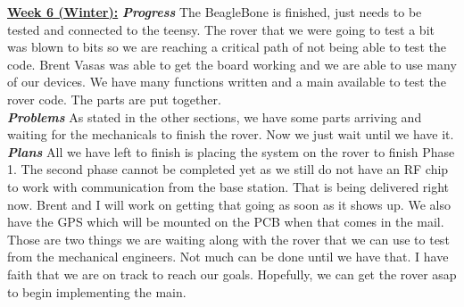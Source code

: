 \documentclass[onecolumn, draftclsnofoot, 10pt, compsoc]{IEEEtran}
\begin{document}
\underline{\textbf{Week 6 (Winter):}}
\newline\textbf{\textit{{Progress}}}
\newline The BeagleBone is finished, just needs to be tested and connected to the teensy. The rover that we were going to test a bit was blown to bits so we are reaching a critical path of not being able to test the code. Brent Vasas was able to get the board working and we are able to use many of our devices. We have many functions written and a main available to test the rover code. The parts are put together. \\
\newline\textbf{\textit{{Problems}}}
\newline As stated in the other sections, we have some parts arriving and waiting for the mechanicals to finish the rover. Now we just wait until we have it. \\
\newline\textbf{\textit{{Plans}}}
\newline All we have left to finish is placing the system on the rover to finish Phase 1. The second phase cannot be completed yet as we still do not have an RF chip to work with communication from the base station. That is being delivered right now. Brent and I will work on getting that going as soon as it shows up. We also have the GPS which will be mounted on the PCB when that comes in the mail. Those are two things we are waiting along with the rover that we can use to test from the mechanical engineers. Not much can be done until we have that. I have faith that we are on track to reach our goals. Hopefully, we can get the rover asap to begin implementing the main. \newline 
\end{document}
